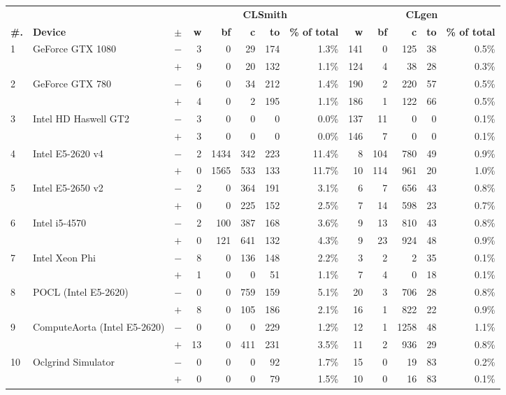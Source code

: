   \begin{tabular}{lll | rrrrr | rrrrr }
  \toprule
  & & & \multicolumn{5}{c|}{\textbf{CLSmith}} & \multicolumn{5}{c}{\textbf{CLgen}} \\
  \textbf{\#.} & \textbf{Device} & $\pm$ &
  \textbf{w} & \textbf{bf} & \textbf{c} & \textbf{to} & \textbf{\% of total} &
  \textbf{w} & \textbf{bf} & \textbf{c} & \textbf{to} & \textbf{\% of total} \\
  \midrule
  \multirow{ 2}{*}{1} & \multirow{ 2}{*}{GeForce GTX 1080} & $-$ & 3 & 0 & 29 & 174 & 1.3\%       & 141 & 0 & 125 & 38 & 0.5\% \\& & $+$ & 9 & 0 & 20 & 132 & 1.1\% & 124 & 4 & 38 & 28 & 0.3\% \\
\hline
\multirow{ 2}{*}{2} & \multirow{ 2}{*}{GeForce GTX 780} & $-$ & 6 & 0 & 34 & 212 & 1.4\%       & 190 & 2 & 220 & 57 & 0.5\% \\& & $+$ & 4 & 0 & 2 & 195 & 1.1\% & 186 & 1 & 122 & 66 & 0.5\% \\
\hline
\multirow{ 2}{*}{3} & \multirow{ 2}{*}{Intel HD Haswell GT2} & $-$ & 3 & 0 & 0 & 0 & 0.0\%       & 137 & 11 & 0 & 0 & 0.1\% \\& & $+$ & 3 & 0 & 0 & 0 & 0.0\% & 146 & 7 & 0 & 0 & 0.1\% \\
\hline
\multirow{ 2}{*}{4} & \multirow{ 2}{*}{Intel E5-2620 v4} & $-$ & 2 & 1434 & 342 & 223 & 11.4\%       & 8 & 104 & 780 & 49 & 0.9\% \\& & $+$ & 0 & 1565 & 533 & 133 & 11.7\% & 10 & 114 & 961 & 20 & 1.0\% \\
\hline
\multirow{ 2}{*}{5} & \multirow{ 2}{*}{Intel E5-2650 v2} & $-$ & 2 & 0 & 364 & 191 & 3.1\%       & 6 & 7 & 656 & 43 & 0.8\% \\& & $+$ & 0 & 0 & 225 & 152 & 2.5\% & 7 & 14 & 598 & 23 & 0.7\% \\
\hline
\multirow{ 2}{*}{6} & \multirow{ 2}{*}{Intel i5-4570} & $-$ & 2 & 100 & 387 & 168 & 3.6\%       & 9 & 13 & 810 & 43 & 0.8\% \\& & $+$ & 0 & 121 & 641 & 132 & 4.3\% & 9 & 23 & 924 & 48 & 0.9\% \\
\hline
\multirow{ 2}{*}{7} & \multirow{ 2}{*}{Intel Xeon Phi} & $-$ & 8 & 0 & 136 & 148 & 2.2\%       & 3 & 2 & 2 & 35 & 0.1\% \\& & $+$ & 1 & 0 & 0 & 51 & 1.1\% & 7 & 4 & 0 & 18 & 0.1\% \\
\hline
\multirow{ 2}{*}{8} & \multirow{ 2}{*}{POCL (Intel E5-2620)} & $-$ & 0 & 0 & 759 & 159 & 5.1\%       & 20 & 3 & 706 & 28 & 0.8\% \\& & $+$ & 8 & 0 & 105 & 186 & 2.1\% & 16 & 1 & 822 & 22 & 0.9\% \\
\hline
\multirow{ 2}{*}{9} & \multirow{ 2}{*}{ComputeAorta (Intel E5-2620)} & $-$ & 0 & 0 & 0 & 229 & 1.2\%       & 12 & 1 & 1258 & 48 & 1.1\% \\& & $+$ & 13 & 0 & 411 & 231 & 3.5\% & 11 & 2 & 936 & 29 & 0.8\% \\
\hline
\multirow{ 2}{*}{10} & \multirow{ 2}{*}{Oclgrind Simulator} & $-$ & 0 & 0 & 0 & 92 & 1.7\%       & 15 & 0 & 19 & 83 & 0.2\% \\& & $+$ & 0 & 0 & 0 & 79 & 1.5\% & 10 & 0 & 16 & 83 & 0.1\% \\
  \bottomrule
\end{tabular}

